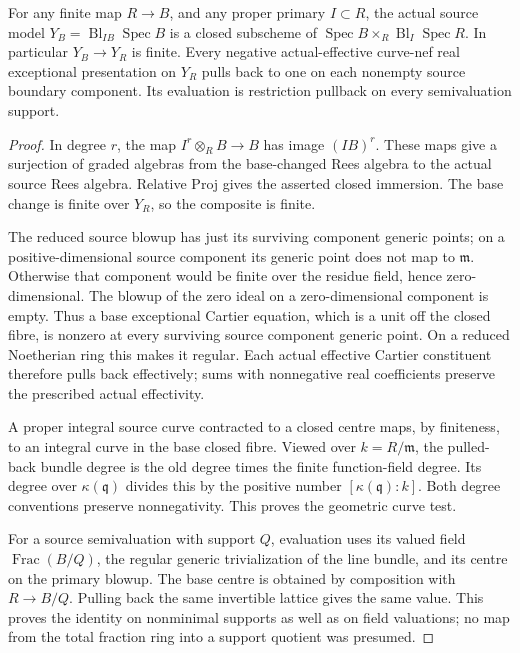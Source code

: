 \begin{proposition}
For any finite map \(R\to B\), and any proper primary \(I\subset R\),
the actual source model \(Y_B=\operatorname{Bl}_{IB}\operatorname{Spec}B\)
is a closed subscheme of
\(\operatorname{Spec}B\times_R\operatorname{Bl}_I\operatorname{Spec}R\).
In particular \(Y_B\to Y_R\) is finite.
Every negative actual-effective curve-nef real exceptional presentation
on \(Y_R\) pulls back to one on each nonempty source boundary component.
Its evaluation is restriction pullback on every semivaluation support.
\end{proposition}
\begin{proof}
In degree \(r\), the map \(I^r\otimes_R B\to B\) has image
\((IB)^r\). These maps give a surjection of graded algebras from the
base-changed Rees algebra to the actual source Rees algebra. Relative
Proj gives the asserted closed immersion. The base change is finite
over \(Y_R\), so the composite is finite.

The reduced source blowup has just its surviving component generic
points; on a positive-dimensional source component its generic point
does not map to \(\mathfrak m\). Otherwise that component would be finite
over the residue field, hence zero-dimensional. The blowup of the zero
ideal on a zero-dimensional component is empty. Thus a base exceptional
Cartier equation, which is a unit off the closed fibre, is nonzero at
every surviving source component generic point. On a reduced Noetherian
ring this makes it regular. Each actual effective Cartier constituent
therefore pulls back effectively; sums with nonnegative real
coefficients preserve the prescribed actual effectivity.

A proper integral source curve contracted to a closed centre maps,
by finiteness, to an integral curve in the base closed fibre.
Viewed over \(k=R/\mathfrak m\), the pulled-back bundle degree is
the old degree times the finite function-field degree. Its degree
over \(\kappa(\mathfrak q)\) divides this by the positive number
\([\kappa(\mathfrak q):k]\). Both degree conventions preserve
nonnegativity. This proves the geometric curve test.

For a source semivaluation with support \(Q\), evaluation uses its
valued field \(\operatorname{Frac}(B/Q)\), the regular generic
trivialization of the line bundle, and its centre on the primary
blowup. The base centre is obtained by composition with
\(R\to B/Q\). Pulling back the same invertible lattice gives the same
value. This proves the identity on nonminimal supports as well as on
field valuations; no map from the total fraction ring into a support
quotient was presumed.
\end{proof}

